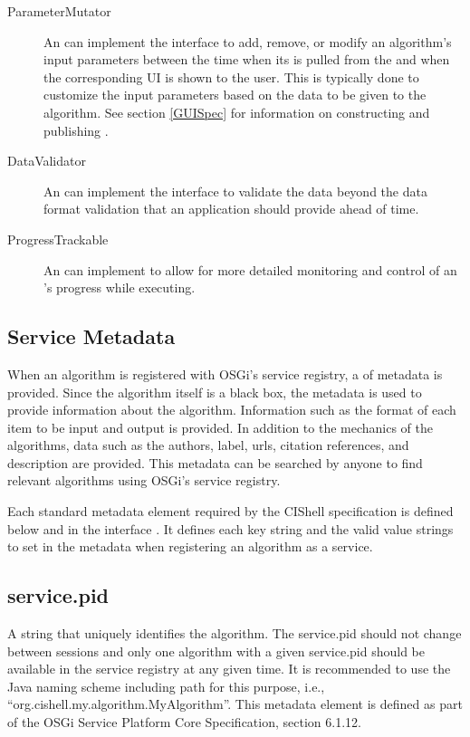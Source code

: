 \begin{description}
  \item[ParameterMutator] An  can implement the
   interface to add, remove, or modify an algorithm's
  input parameters between the time when its  is pulled
  from the  and when the corresponding UI is shown to the
  user. This is typically done to customize the input parameters based on the
  data to be given to the algorithm. See section \ref{GUISpec} for information
  on constructing and publishing .
  
  \item[DataValidator] An  can implement the
   interface to validate the data beyond the data format
  validation that an application should provide ahead of time.

  \item[ProgressTrackable] An  can implement
   to allow for more detailed monitoring and control
  of an 's progress while executing.
\end{description}

\subsection{Service Metadata}
\label{algMetaData}

When an algorithm is registered with OSGi's service registry, a
 of metadata is provided. Since the algorithm itself is a black
box, the metadata is used to provide information about the algorithm. Information
such as the format of each  item to be input and output is provided.
In addition to the mechanics of the algorithms, data such as the authors, label,
urls, citation references, and description are provided. This metadata can be
searched by anyone to find relevant algorithms using OSGi's service registry.

Each standard metadata element required by the CIShell specification is defined
below and in the interface . It defines each key string
and the valid value strings to set in the metadata  when
registering an algorithm as a service.

\subsection*{service.pid}
A string that uniquely identifies the algorithm. The service.pid should not
change between sessions and only one algorithm with a given service.pid should
be available in the service registry at any given time. It is recommended to 
use the Java naming scheme including path for this purpose, i.e.,
``org.cishell.my.algorithm.MyAlgorithm''. This metadata element is defined
as part of the OSGi Service Platform Core Specification, section 6.1.12. 

